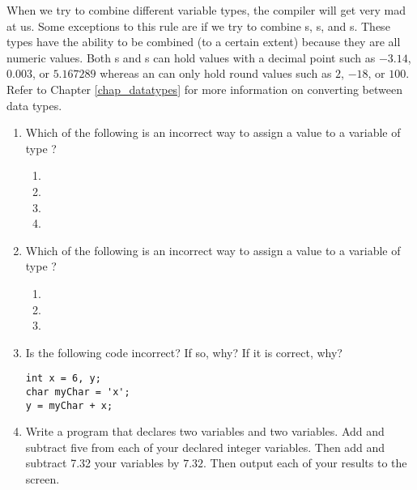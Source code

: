 When we try to combine different variable types, the compiler will get very mad at us. 
Some exceptions to this rule are if we try to combine s, s, and s.
These types have the ability to be combined (to a certain extent) because they are all numeric values.
Both s and s can hold values with a decimal point such as $-3.14$, $0.003$, or $5.167289$ whereas an  can only hold round values such as $2$, $-18$, or $100$. 
Refer to Chapter \ref{chap_datatypes} for more information on converting between data types.


\begin{enumerate}
	\item Which of the following is an incorrect way to assign a value to a variable  of type ?
	\begin{enumerate}
	  \item {}
		\item {}
		\item {}
		\item {}
	\end{enumerate}

	\item Which of the following is an incorrect way to assign a value to a variable of type ?
	\begin{enumerate}
		\item {}
		\item {}
		\item {}
	\end{enumerate}

 \item Is the following code incorrect? If so, why? If it is correct, why?

\noindent\begin{minipage}{\linewidth}\begin{lstlisting}
int x = 6, y;
char myChar = 'x';
y = myChar + x;
\end{lstlisting}\end{minipage}

  \item Write a program that declares two  variables and two  variables. 
  Add and subtract five from each of your declared integer variables. 
  Then add and subtract 7.32 your  variables by $7.32$. 
  Then output each of your results to the screen. 
\end{enumerate}


